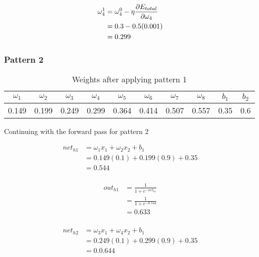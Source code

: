 \documentclass[10pt,a4paper]{article}
\begin{document}
\begin{equation}
\begin{split}
\omega_4^1 &= \omega_4^0 - \eta\pdv{E_{total}}{\omega_4}\\
           &= 0.3 -0.5(0.001)\\
           &= 0.299\\
\end{split}
\end{equation}

\subsubsection{Pattern 2}
\begin{table}
\begin{tabular}{|c|c|c|c|c|c|c|c|c|c|}
\hline
$\omega_1$ & $\omega_2$ & $\omega_3$ & $\omega_4$ & $\omega_5$ & $\omega_6$ & $\omega_7$ & $\omega_8$ & $b_1$ & $b_2$\\
\hline
0.149 &0.199 &0.249 & 0.299 & 0.364 & 0.414 & 0.507 & 0.557 & 0.35 & 0.6 \\
\hline
\end{tabular}
\caption{Weights after applying pattern 1}\label{tablep2}
\end{table}

Continuing with the forward pass for pattern 2

\begin{equation}
\begin{split}
net_{h1} &= \omega_1 x_1 + \omega_2 x_2 + b_1 \\
         &= 0.149(0.1) + 0.199(0.9) + 0.35 \\
         &= 0.544\\
\end{split}
\end{equation}

\begin{equation}
\begin{split}
out_{h1} &= \frac{1}{1+e^{-net_{h1}}}\\ 
         &= \frac{1}{1+e^{-0.544}}\\ 
         &= 0.633\\
\end{split}
\end{equation}

\begin{equation}
\begin{split}
net_{h2} &= \omega_3 x_1 + \omega_4 x_2 + b_1 \\
         &= 0.249(0.1) + 0.299(0.9) + 0.35 \\
         &= 0.0.644\\
\end{split}
\end{equation}
\end{document}
